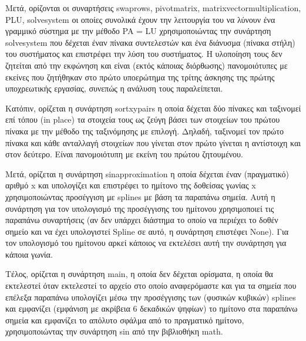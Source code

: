 \documentclass[a4paper,11pt]{article}
\newcommand{\lt}{\latintext}
\begin{document}
\par
Μετά, ορίζονται οι συναρτήσεις {\lt swap\textunderscore rows, pivot\textunderscore matrix, matrix\textunderscore vector\textunderscore multiplication, PLU, solve\textunderscore system} οι οποίες συνολικά έχουν την λειτουργία του να λύνουν ένα γραμμικό σύστημα με την μέθοδο {\lt PA = LU} χρησιμοποιώντας την συνάρτηση {\lt solve\textunderscore system} που δέχεται έναν πίνακα συντελεστών και ένα διάνυσμα (πίνακα στήλη) του συστήματος και επιστρέφει την λύση του συστήματος. Η υλοποίηση τους δεν ζητείται από την εκφώνηση και είναι (εκτός κάποιας διόρθωσης) πανομοιότυπες με εκείνες που ζητήθηκαν στο πρώτο υποερώτημα της τρίτης άσκησης της πρώτης υποχρεωτικής εργασίας, συνεπώς η ανάλυση τους παραλείπεται.\\

\par
Κατόπιν, ορίζεται η συνάρτηση {\lt sort\textunderscore xy\textunderscore pairs} η οποία δέχεται δύο πίνακες και ταξινομεί επί τόπου ({\lt in place}) τα στοιχεία τους ως ζεύγη βάσει των στοιχείων του πρώτου πίνακα με την μέθοδο της ταξινόμησης με επιλογή. Δηλαδή, ταξινομεί τον πρώτο πίνακα και κάθε ανταλλαγή στοιχείων που γίνεται στον πρώτο γίνεται η αντίστοιχη και στον δεύτερο. Είναι πανομοιότυπη με εκείνη του πρώτου ζητουμένου.\\

\par
Μετά, ορίζεται η συνάρτηση {\lt sin\textunderscore approximation} η οποία δέχεται έναν (πραγματικό) αριθμό {\lt x} και υπολογίζει και επιστρέφει το ημίτονο της δοθείσας γωνίας {\lt x} χρησιμοποιώντας προσέγγιση με {\lt splines} με βάση τα παραπάνω σημεία. Αυτή η συνάρτηση για τον υπολογισμό της προσέγγισης του ημίτονου χρησιμοποιεί τις παραπάνω συναρτήσεις (αν δεν υπάρχει διάστημα το οποίο να περιέχει το δοθέν σημείο και να έχει υπολογιστεί {\lt Spline} σε αυτό, η συνάρτηση επιστέφει {\lt None}). Για τον υπολογισμό του ημίτονου αρκεί κάποιος να εκτελέσει αυτή την συνάρτηση για κάποια γωνία.\\

\par
Τέλος, ορίζεται η συνάρτηση {\lt main}, η οποία δεν δέχεται ορίσματα, η οποία θα εκτελεστεί όταν εκτελεστεί το αρχείο στο οποίο αναφερόμαστε και για τα σημεία που επέλεξα παραπάνω υπολογίζει μέσω την προσέγγισης των (φυσικών κυβικών) {\lt splines} και εμφανίζει  (εμφάνιση με ακρίβεια 6 δεκαδικών ψηφίων) το ημίτονο στα παραπάνω σημεία και εμφανίζει το απόλυτο σφάλμα από το πραγματικό ημίτονο, χρησιμοποιώντας την συνάρτηση {\lt sin} από την βιβλιοθήκη {\lt math}.\\
\end{document}
